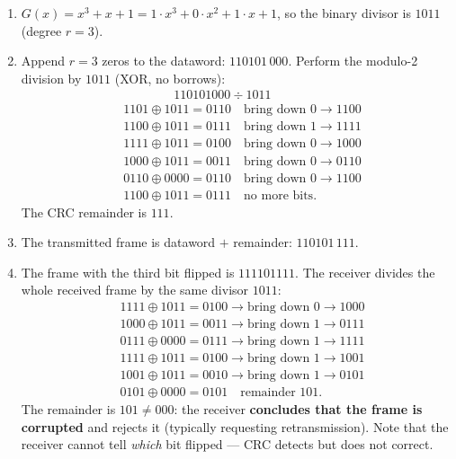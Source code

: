 \documentclass[11pt]{article}
\begin{document}
\begin{corrige}
\begin{enumerate}
\item $G(x) = x^3 + x + 1 = 1\cdot x^3 + 0\cdot x^2 + 1\cdot x + 1$, so the binary divisor is $\boxed{1011}$ (degree $r = 3$).
\item Append $r = 3$ zeros to the dataword: $110101\,000$. Perform the modulo-2 division by $1011$ (XOR, no borrows):
\begin{align*}
&\phantom{00000000}110101000 \div 1011 \\
&1101 \oplus 1011 = 0110 \quad \text{bring down } 0 \rightarrow 1100 \\
&1100 \oplus 1011 = 0111 \quad \text{bring down } 1 \rightarrow 1111 \\
&1111 \oplus 1011 = 0100 \quad \text{bring down } 0 \rightarrow 1000 \\
&1000 \oplus 1011 = 0011 \quad \text{bring down } 0 \rightarrow 0110 \\
&0110 \oplus 0000 = 0110 \quad \text{bring down } 0 \rightarrow 1100 \\
&1100 \oplus 1011 = 0111 \quad \text{no more bits.}
\end{align*}
The CRC remainder is $\boxed{111}$.
\item The transmitted frame is dataword $+$ remainder: $\boxed{110101\,111}$.
\item The frame with the third bit flipped is $111101111$. The receiver divides the whole received frame by the same divisor $1011$:
\begin{align*}
&1111 \oplus 1011 = 0100 \rightarrow \text{bring down } 0 \rightarrow 1000 \\
&1000 \oplus 1011 = 0011 \rightarrow \text{bring down } 1 \rightarrow 0111 \\
&0111 \oplus 0000 = 0111 \rightarrow \text{bring down } 1 \rightarrow 1111 \\
&1111 \oplus 1011 = 0100 \rightarrow \text{bring down } 1 \rightarrow 1001 \\
&1001 \oplus 1011 = 0010 \rightarrow \text{bring down } 1 \rightarrow 0101 \\
&0101 \oplus 0000 = 0101 \quad \text{remainder } 101.
\end{align*}
The remainder is $101 \neq 000$: the receiver \textbf{concludes that the frame is corrupted} and rejects it (typically requesting retransmission). Note that the receiver cannot tell \emph{which} bit flipped — CRC detects but does not correct.
\end{enumerate}
\end{corrige}
\end{document}
